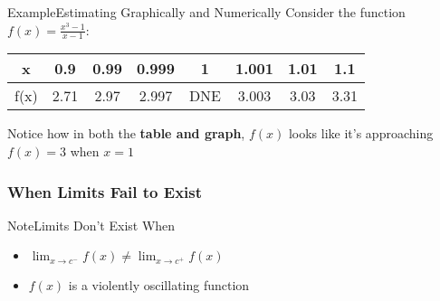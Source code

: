 \documentclass{MathNotes}
\newenvironment{example}[1]
{\begin{BlueBox}{Example}{#1}}{\end{BlueBox}}
\newenvironment{note}[1]
{\begin{YellowBox}{Note}{#1}}{\end{YellowBox}}
\begin{document}
\begin{example}{Estimating Graphically and Numerically}\label{ex:1.1}
    Consider the function $f(x)=\frac{x^3-1}{x-1}$:
    \begin{center}

        \begin{tabular}{ |c||c|c|c|c|c|c|c| }
            \hline
            x    & 0.9 & 0.99 & 0.999 & 1 & 1.001 & 1.01 & 1.1\\
            \hline
            f(x) & 2.71 & 2.97 & 2.997 &DNE& 3.003 & 3.03 & 3.31 \\
            \hline
        \end{tabular}
    \end{center}

    Notice how in both the \textbf{table and graph}, $f(x)$ looks like it's
    approaching $f(x)=3$ when $x=1$
\end{example}

\subsubsection{When Limits Fail to Exist}
\begin{note}{Limits Don't Exist When}
    \begin{itemize}
        \item $\lim_{x\to c^-}f(x)\neq \lim_{x\to c^+}f(x)$
        \item $f(x)$ is a violently oscillating function
    \end{itemize}
\end{note}
\end{document}
